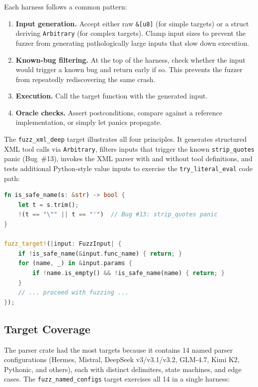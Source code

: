 Each harness follows a common pattern:

\begin{enumerate}
  \item \textbf{Input generation.} Accept either raw \texttt{\&[u8]} (for simple targets) or a struct deriving \texttt{Arbitrary} (for complex targets). Clamp input sizes to prevent the fuzzer from generating pathologically large inputs that slow down execution.
  \item \textbf{Known-bug filtering.} At the top of the harness, check whether the input would trigger a known bug and return early if so. This prevents the fuzzer from repeatedly rediscovering the same crash.
  \item \textbf{Execution.} Call the target function with the generated input.
  \item \textbf{Oracle checks.} Assert postconditions, compare against a reference implementation, or simply let panics propagate.
\end{enumerate}

The \texttt{fuzz\_xml\_deep} target illustrates all four principles. It generates structured XML tool calls via \texttt{Arbitrary}, filters inputs that trigger the known \texttt{strip\_quotes} panic (Bug~\#13), invokes the XML parser with and without tool definitions, and tests additional Python-style value inputs to exercise the \texttt{try\_literal\_eval} code path:

\begin{lstlisting}[language=Rust,caption={Filtering known bugs at the top of the harness.}]
fn is_safe_name(s: &str) -> bool {
    let t = s.trim();
    !(t == "\"" || t == "'")  // Bug #13: strip_quotes panic
}

fuzz_target!(|input: FuzzInput| {
    if !is_safe_name(&input.func_name) { return; }
    for (name, _) in &input.params {
        if !name.is_empty() && !is_safe_name(name) { return; }
    }
    // ... proceed with fuzzing ...
});
\end{lstlisting}

\subsection{Target Coverage}

The parser crate had the most targets because it contains 14 named parser configurations (Hermes, Mistral, DeepSeek v3/v3.1/v3.2, GLM-4.7, Kimi K2, Pythonic, and others), each with distinct delimiters, state machines, and edge cases. The \texttt{fuzz\_named\_configs} target exercises all 14 in a single harness:

